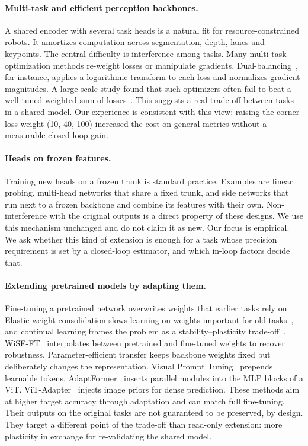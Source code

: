 \documentclass[10pt,twocolumn,letterpaper]{article}
\begin{document}
\paragraph{Multi-task and efficient perception backbones.}
A shared encoder with several task heads is a natural fit for resource-constrained robots. It amortizes computation across segmentation, depth, lanes and keypoints. The central difficulty is interference among tasks. Many multi-task optimization methods re-weight losses or manipulate gradients. Dual-balancing~\cite{Lin2023DualbalancingMultitask}, for instance, applies a logarithmic transform to each loss and normalizes gradient magnitudes. A large-scale study found that such optimizers often fail to beat a well-tuned weighted sum of losses~\cite{Xin2022DoCurrent}. This suggests a real trade-off between tasks in a shared model. Our experience is consistent with this view: raising the corner loss weight (10, 40, 100) increased the cost on general metrics without a measurable closed-loop gain.

\paragraph{Heads on frozen features.}
Training new heads on a frozen trunk is standard practice. Examples are linear probing, multi-head networks that share a fixed trunk, and side networks that run next to a frozen backbone and combine its features with their own. Non-interference with the original outputs is a direct property of these designs. We use this mechanism unchanged and do not claim it as new. Our focus is empirical. We ask whether this kind of extension is enough for a task whose precision requirement is set by a closed-loop estimator, and which in-loop factors decide that.

\paragraph{Extending pretrained models by adapting them.}
Fine-tuning a pretrained network overwrites weights that earlier tasks rely on. Elastic weight consolidation slows learning on weights important for old tasks~\cite{Kirkpatrick2016OvercomingCatastrophic}, and continual learning frames the problem as a stability--plasticity trade-off~\cite{Wang2023ComprehensiveSurvey}. WiSE-FT~\cite{Wortsman2021RobustFinetuning} interpolates between pretrained and fine-tuned weights to recover robustness. Parameter-efficient transfer keeps backbone weights fixed but deliberately changes the representation. Visual Prompt Tuning~\cite{Jia2022VisualPrompt} prepends learnable tokens. AdaptFormer~\cite{Chen2022AdaptformerAdapting} inserts parallel modules into the MLP blocks of a ViT. ViT-Adapter~\cite{Chen2022VisionTransformer} injects image priors for dense prediction. These methods aim at higher target accuracy through adaptation and can match full fine-tuning. Their outputs on the original tasks are not guaranteed to be preserved, by design. They target a different point of the trade-off than read-only extension: more plasticity in exchange for re-validating the shared model.
\end{document}
